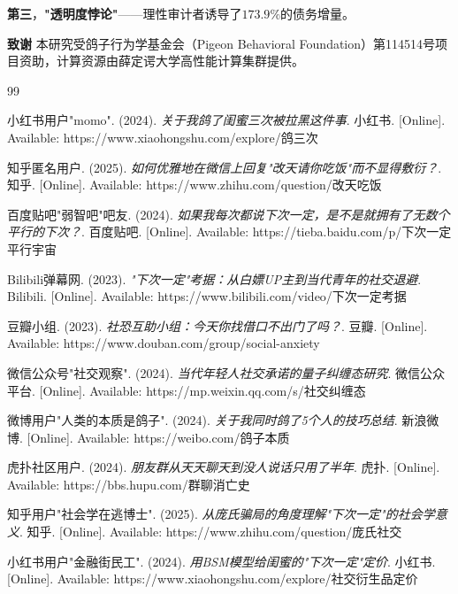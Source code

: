 \documentclass[journal]{IEEEtran}
\begin{document}
\textbf{第三}，\textbf{"透明度悖论"}——理性审计者诱导了$173.9\%$的债务增量。

\textbf{致谢} 本研究受鸽子行为学基金会（Pigeon Behavioral Foundation）第114514号项目资助，计算资源由薛定谔大学高性能计算集群提供。

\begin{thebibliography}{99}

 小红书用户"momo". (2024). \textit{关于我鸽了闺蜜三次被拉黑这件事}. 小红书. [Online]. Available: https://www.xiaohongshu.com/explore/鸽三次

 知乎匿名用户. (2025). \textit{如何优雅地在微信上回复"改天请你吃饭"而不显得敷衍？}. 知乎. [Online]. Available: https://www.zhihu.com/question/改天吃饭

 百度贴吧"弱智吧"吧友. (2024). \textit{如果我每次都说下次一定，是不是就拥有了无数个平行的下次？}. 百度贴吧. [Online]. Available: https://tieba.baidu.com/p/下次一定平行宇宙

 Bilibili弹幕网. (2023). \textit{"下次一定"考据：从白嫖UP主到当代青年的社交退避}. Bilibili. [Online]. Available: https://www.bilibili.com/video/下次一定考据

 豆瓣小组. (2023). \textit{社恐互助小组：今天你找借口不出门了吗？}. 豆瓣. [Online]. Available: https://www.douban.com/group/social-anxiety

 微信公众号"社交观察". (2024). \textit{当代年轻人社交承诺的量子纠缠态研究}. 微信公众平台. [Online]. Available: https://mp.weixin.qq.com/s/社交纠缠态

 微博用户"人类的本质是鸽子". (2024). \textit{关于我同时鸽了5个人的技巧总结}. 新浪微博. [Online]. Available: https://weibo.com/鸽子本质

 虎扑社区用户. (2024). \textit{朋友群从天天聊天到没人说话只用了半年}. 虎扑. [Online]. Available: https://bbs.hupu.com/群聊消亡史

 知乎用户"社会学在逃博士". (2025). \textit{从庞氏骗局的角度理解"下次一定"的社会学意义}. 知乎. [Online]. Available: https://www.zhihu.com/question/庞氏社交

 小红书用户"金融街民工". (2024). \textit{用BSM模型给闺蜜的"下次一定"定价}. 小红书. [Online]. Available: https://www.xiaohongshu.com/explore/社交衍生品定价


\end{thebibliography}
\end{document}
